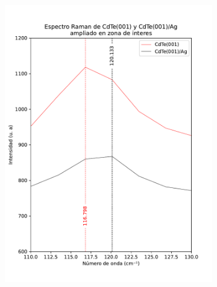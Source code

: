 \begin{figure}[H]
    \centering
    \begin{subfigure}[b]{0.49\textwidth}
        \centering
        \includegraphics[width = 1\textwidth]{figures/chap4/cdte-ag/raman-results/raman-CdTeAg-250-T-zoom2.pdf}
    \end{subfigure}\hfill
    \begin{subfigure}[b]{0.49\textwidth}
        \centering

\end{subfigure}
\end{figure}
